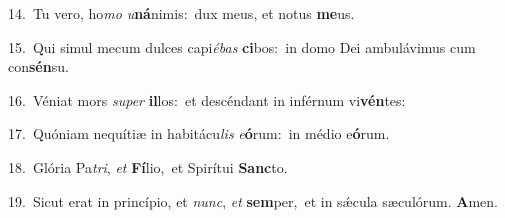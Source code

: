 {\numbfont\textcolor{\numbcolor}{14.}}~Tu vero, ho\textit{mo} \textit{u}\-\textbf{ná}nimis:~\star dux meus, et notus \textbf{me}\-us.\par
{\numbfont\textcolor{\numbcolor}{15.}}~Qui simul mecum dulces capi\-\textit{é}\-\textit{bas} \textbf{ci}\-bos:~\star in domo Dei ambulávimus cum con\-\textbf{sén}\-su.\par
{\numbfont\textcolor{\numbcolor}{16.}}~Véniat mors \textit{su}\-\textit{per} \textbf{il}\-los:~\star et descéndant in inférnum vi\-\textbf{vén}\-tes:\par
{\numbfont\textcolor{\numbcolor}{17.}}~Quóniam nequítiæ in habitácu\textit{lis} \textit{e}\-\textbf{ó}rum:~\star in médio e\-\textbf{ó}\-rum.\par
{\numbfont\textcolor{\numbcolor}{18.}}~Glória Pa\-\textit{tri}\-, \textit{et} \textbf{Fí}\-lio,~\star et Spirítui \textbf{Sanc}\-to.\par
{\numbfont\textcolor{\numbcolor}{19.}}~Sicut erat in princípio, et \textit{nunc}\-, \textit{et} \textbf{sem}\-per,~\star et in sǽcula sæculórum. \textbf{A}\-men.\par
